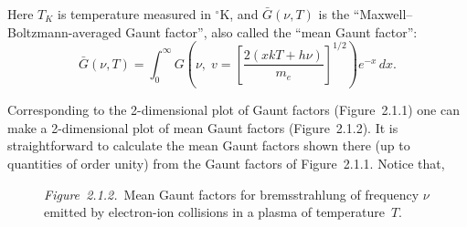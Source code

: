 
Here $T_K$ is temperature measured in ${}^\circ$K, and $\bar{G}(\nu,T)$ is the ``Maxwell--Boltzmann-averaged
Gaunt factor'', also called the ``mean Gaunt factor'':
\begin{equation}
\bar{G}(\nu,T) = \int_0^\infty
G\!\left(\nu,\;v = \left[\frac{2(xkT + h\nu)}{m_e}\right]^{1/2}\right)
e^{-x}\,dx.
\tag{2.1.28}
\end{equation}

Corresponding to the 2-dimensional plot of Gaunt factors (Figure~2.1.1) one
can make a 2-dimensional plot of mean Gaunt factors (Figure~2.1.2).  It is
straightforward to calculate the mean Gaunt factors shown there (up to
quantities of order unity) from the Gaunt factors of Figure~2.1.1.  Notice that,


\begin{figure}[htbp]
\centering
\caption{\textit{Figure~2.1.2.}\ Mean Gaunt factors for bremsstrahlung of frequency $\nu$ emitted by
electron-ion collisions in a plasma of temperature~$T$.}
\label{fig:2.1.2}
\end{figure}

